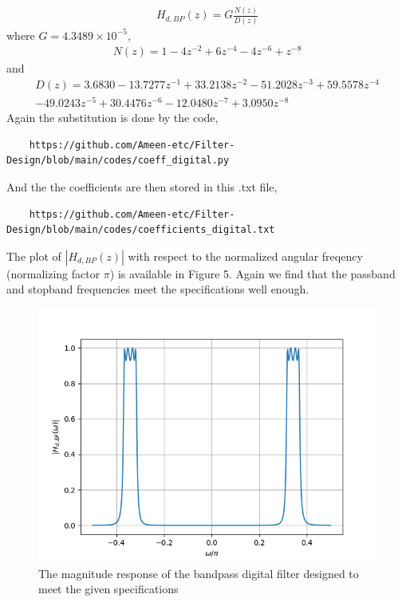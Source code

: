 \documentclass{article}
\begin{document}
\begin{eqnarray}
H_{d,BP}(z) = G \frac{N(z)}{D(z)}
\end{eqnarray}
where $G = 4.3489 \times 10^{-5}$,
\begin{eqnarray}
N(z)=  1 - 4 z^{-2} + 6 z^{-4} - 4z^{-6} + z^{-8} 
\end{eqnarray}
and
\begin{eqnarray}
D(z) = 3.6830  -13.7277z^{-1} + 33.2138z^{-2}  -51.2028z^{-3}+  59.5578z^{-4}\nonumber \\
  -49.0243z^{-5}+   30.4476z^{-6}  -12.0480z^{-7} +   3.0950z^{-8}
\end{eqnarray}
Again the substitution is done by the code,
\begin{lstlisting}
    https://github.com/Ameen-etc/Filter-Design/blob/main/codes/coeff_digital.py
\end{lstlisting}
And the the coefficients are then stored in this .txt file,
\begin{lstlisting}
    https://github.com/Ameen-etc/Filter-Design/blob/main/codes/coefficients_digital.txt
\end{lstlisting}
The plot of $|H_{d,BP}(z)|$ with respect to the normalized angular freqency (normalizing factor $\pi$) is available in Figure 5.  Again we
find that the passband and stopband frequencies meet the specifications well enough.
\begin{figure}
\label{fig4}
\includegraphics[width = 15cm]{figs/figure4.png}
\caption{The magnitude response of the bandpass digital filter designed to meet the given specifications}
\end{figure}
\end{document}
